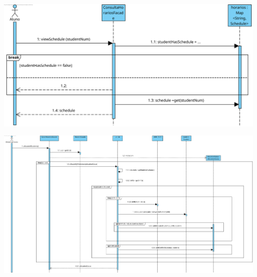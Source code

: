 \documentclass[a4paper,12pt]{scrreprt}
\begin{document}
\begin{minipage}{\textwidth}
    \centering
    \includegraphics[width=1\textwidth]{images/sequence-diagrams/1-consultar-horario.png}
    \label{fig:8-1-diagrama_de_sequencia_consultar_horario}
\end{minipage}

\vspace{1cm}

\begin{minipage}{\textwidth}
    \centering
    \includegraphics[width=1\textwidth]{images/sequence-diagrams/2-gerar-horarios.png}
    \label{fig:8-2-diagrama_de_sequencia_gerar_horarios}
\end{minipage}
\end{document}
